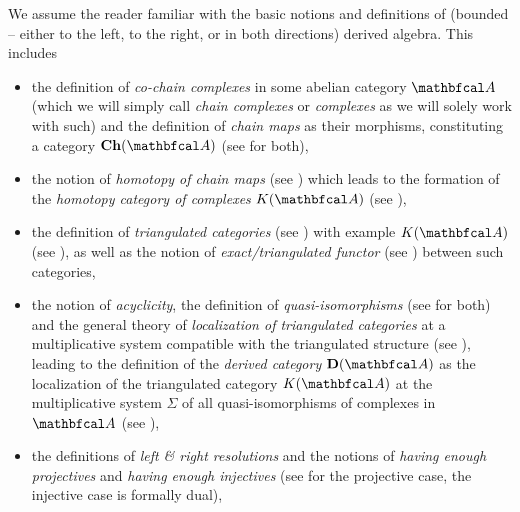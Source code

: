 We assume the reader familiar with the basic notions and definitions of (bounded -- either to the left, to the right, or in both directions) derived algebra. This includes
\begin{itemize}
	\item 
	the definition of \emph{co-chain complexes} in some abelian category $\category{A}$ (which we will simply call \emph{chain complexes} or \emph{complexes} as we will solely work with such) and the definition of \emph{chain maps} as their morphisms, constituting a category $\complexes{\category{A}}$ (see \cite[\href{https://stacks.math.columbia.edu/tag/010V}{Tag 010V}]{stacks-project} for both),
	
	\item 
	the notion of \emph{homotopy of chain maps} (see \cite[\href{https://stacks.math.columbia.edu/tag/0112}{Tag 0112}]{stacks-project}) which leads to the formation of the \emph{homotopy category of complexes} $\homotopyCategoryOfComplexes{\category{A}}$ (see \cite[\href{https://stacks.math.columbia.edu/tag/05RN}{Tag 05RN}]{stacks-project}),
	
	\item
	the definition of \emph{triangulated categories} (see \cite[\href{https://stacks.math.columbia.edu/tag/05QK}{Tag 05QK}]{stacks-project}) with example $\homotopyCategoryOfComplexes{\category{A}}$ (see \cite[\href{https://stacks.math.columbia.edu/tag/014S}{Tag 014S}]{stacks-project}), as well as the notion of \emph{exact/triangulated functor} (see \cite[\href{https://stacks.math.columbia.edu/tag/014V}{Tag 014V}]{stacks-project}) between such categories,
	
	\item
	the notion of \emph{acyclicity}, the definition of \emph{quasi-isomorphisms} (see \cite[\href{https://stacks.math.columbia.edu/tag/010Z}{Tag 010Z}]{stacks-project} for both) and the general theory of \emph{localization of triangulated categories} at a multiplicative system compatible with the triangulated structure (see \cite[\href{https://stacks.math.columbia.edu/tag/05R1}{Tag 05R1}]{stacks-project}), leading to the definition of the \emph{derived category} $\derived{\category{A}}$ as the localization of the triangulated category $\homotopyCategoryOfComplexes{\category{A}}$ at the multiplicative system $\Sigma$ of all quasi-isomorphisms of complexes in $\category{A}$ (see \cite[\href{https://stacks.math.columbia.edu/tag/05RU}{Tag 05RU}]{stacks-project}),
	
	\item
	the definitions of \emph{left \& right resolutions} and the notions of \emph{having enough projectives} and \emph{having enough injectives} (see \cite[\href{https://stacks.math.columbia.edu/tag/0643}{Tag 0643}]{stacks-project} for the projective case, the injective case is formally dual),
	

\end{itemize}

